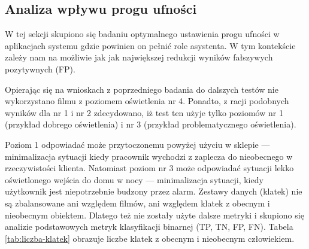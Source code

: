 \subsection{Analiza wpływu progu ufności}
W tej sekcji skupiono się badaniu optymalnego ustawienia progu ufności w aplikacjach systemu gdzie powinien on pełnić role asystenta. W tym kontekście zależy nam na możliwie jak jak największej redukcji wyników fałszywych pozytywnych (FP). 

Opierając się na wnioskach z poprzedniego badania do dalszych testów nie wykorzystano filmu z poziomem oświetlenia nr 4. 
Ponadto, z racji podobnych wyników dla nr 1 i nr 2 zdecydowano, iż test ten użyje tylko poziomów nr 1 (przykład dobrego oświetlenia) i nr 3 (przykład problematycznego oświetlenia). 

Poziom 1 odpowiadać może przytoczonemu powyżej użyciu w sklepie --- minimalizacja sytuacji kiedy pracownik wychodzi z zaplecza do nieobecnego w rzeczywistości klienta.
Natomiast poziom nr 3 może odpowiadać sytuacji lekko oświetlonego wejścia do domu w nocy --- minimalizacja sytuacji, kiedy użytkownik jest niepotrzebnie budzony przez alarm. Zestawy danych (klatek) nie są zbalansowane ani względem filmów, ani względem klatek z obecnym i nieobecnym obiektem. Dlatego też nie zostały użyte dalsze metryki i skupiono się analizie podstawowych metryk klasyfikacji binarnej (TP, TN, FP, FN). 
Tabela \ref{tab:liczba-klatek} obrazuje liczbe klatek z obecnym i nieobecnym człowiekiem.


